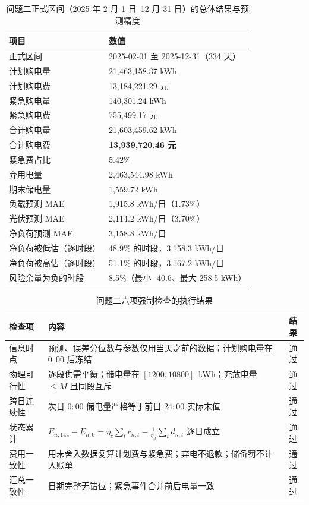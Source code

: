 \begin{table}[htbp]
  \centering
  \caption{问题二正式区间（2025 年 2 月 1 日--12 月 31 日）的总体结果与预测精度}
  \label{tab:p2-totals}
  \footnotesize
  \begin{tabular}{ll}
    \toprule
    项目 & 数值 \\
    \midrule
    正式区间 & 2025-02-01 至 2025-12-31（334 天） \\
    计划购电量 & 21,463,158.37 kWh \\
    计划购电费 & 13,184,221.29 元 \\
    紧急购电量 & 140,301.24 kWh \\
    紧急购电费 & 755,499.17 元 \\
    合计购电量 & 21,603,459.62 kWh \\
    合计购电费 & \textbf{13,939,720.46 元} \\
    紧急费占比 & 5.42\% \\
    弃用电量 & 2,463,544.98 kWh \\
    期末储电量 & 1,559.72 kWh \\
    负载预测 MAE & 1,915.8 kWh/日（1.73\%） \\
    光伏预测 MAE & 2,114.2 kWh/日（3.70\%） \\
    净负荷预测 MAE & 3,158.8 kWh/日 \\
    净负荷被低估（逐时段） & 48.9\% 的时段，3,158.3 kWh/日 \\
    净负荷被高估（逐时段） & 51.1\% 的时段，3,167.2 kWh/日 \\
    风险余量为负的时段 & 8.5\%（最小 -40.6、最大 258.5 kWh） \\
    \bottomrule
  \end{tabular}
\end{table}

\begin{table}[htbp]
  \centering
  \caption{问题二六项强制检查的执行结果}
  \label{tab:p2-checks}
  \footnotesize
  \begin{tabular}{llc}
    \toprule
    检查项 & 内容 & 结果 \\
    \midrule
    信息时点 & 预测、误差分位数与参数仅用当天之前的数据；计划购电量在 $0{:}00$ 后冻结 & 通过 \\
    物理可行性 & 逐段供需平衡；储电量在 $[1200,10800]$~kWh；充放电量 $\le M$ 且同段互斥 & 通过 \\
    跨日连续性 & 次日 $0{:}00$ 储电量严格等于前日 $24{:}00$ 实际末值 & 通过 \\
    状态累计 & $E_{n,144}-E_{n,0}=\eta_c\sum_t c_{n,t}-\frac{1}{\eta_d}\sum_t d_{n,t}$ 逐日成立 & 通过 \\
    费用一致性 & 用未舍入数据复算计划费与紧急费；弃电不退款；储备罚不计入账单 & 通过 \\
    汇总一致性 & 日期完整无错位；紧急事件合并前后电量一致 & 通过 \\
    \bottomrule
  \end{tabular}
\end{table}

